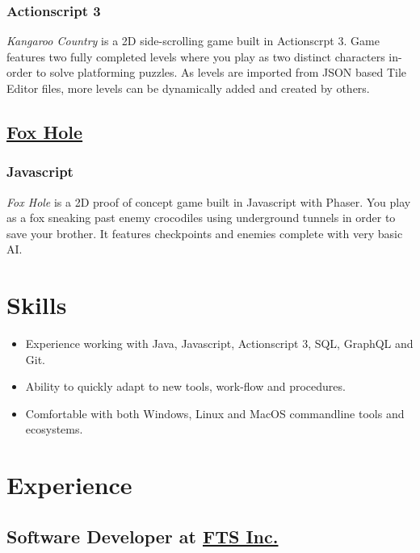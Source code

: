 \documentclass[letterpaper]{article}
\begin{document}
\subsubsection{Actionscript 3}
\label{sec:orgca12bfc}
\emph{Kangaroo Country} is a 2D side-scrolling game built in Actionscrpt 3. Game features two fully completed levels where you play as two distinct characters in-order to solve platforming puzzles. As levels are imported from JSON based Tile Editor files, more levels can be dynamically added and created by others.
\iffalse
\begin{center}
\texttt{[image: ./images/kangaroo/2.png]}
\end{center}
\fi
\subsection{\href{https://github.com/woofers/fox-hole}{Fox Hole}}
\label{sec:org0bc6212}
\subsubsection{Javascript}
\label{sec:orge6f9e13}
\emph{Fox Hole} is a 2D proof of concept game built in Javascript with Phaser. You play as a fox sneaking past enemy crocodiles using underground tunnels in order to save your brother. It features checkpoints and enemies complete with very basic AI.
\iffalse
\begin{center}
\texttt{[image: ./images/fox/1.png]}
\end{center}
\fi
\section{Skills}
\label{sec:orga716655}
\begin{itemize}
\item Experience working with Java, Javascript, Actionscript 3, SQL, GraphQL and Git.
\item Ability to quickly adapt to new tools, work-flow and procedures.
\item Comfortable with both Windows, Linux and MacOS commandline tools and ecosystems.
\end{itemize}
\toggleurlstyle
\section{Experience}
\label{sec:orgbeabaa9}
\subsection{Software Developer at \href{https://ftsinc.com}{FTS Inc.}}
\label{sec:org202dccc}
\vspace{-2.4ex}
\end{document}
